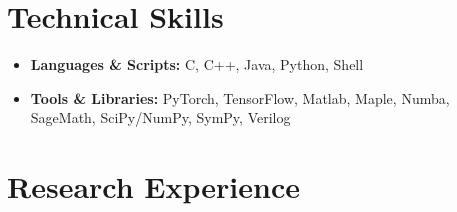 \documentclass[10pt,a4paper,roman,colorlinks,linkcolor=true]{moderncv}        %
\makeatletter
\newcommand*{\customcvproject}[4][.25em]{
  \begin{tabular}{@{}l}
    {\bfseries #2}
  \end{tabular}
  \hfill%
  \begin{tabular}{l@{}}
    {\itshape #3}
  \end{tabular}
  \ifx&#4&%
  \else{\\%
    \begin{minipage}{\maincolumnwidth}%
      \small#4%
  \end{minipage}}\fi%
\par\addvspace{#1}}
\makeatother
\begin{document}
\section{Technical Skills}
\begin{itemize}
  \item \noindent \textbf{Languages \& Scripts:} C, C++, Java, Python, Shell
  \item \textbf{Tools \& Libraries:} PyTorch, TensorFlow, Matlab, Maple, Numba, SageMath, SciPy/NumPy, SymPy, Verilog
\end{itemize}



\section{Research Experience}
\end{document}
